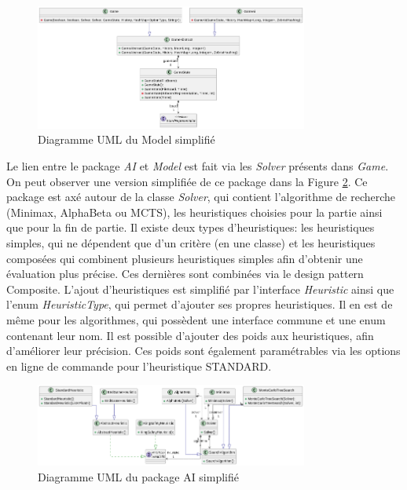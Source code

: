 \documentclass{article}
\begin{document}
\begin{figure}[h]
    \centering
    \includegraphics[width=0.8\textwidth]{uml_model}
    \caption{Diagramme UML du Model simplifié}
    \label{umlModel}
\end{figure}
\FloatBarrier

Le lien entre le package \textit{AI} et \textit{Model} est fait via les \textit{Solver} présents dans \textit{Game}.
On peut observer une version simplifiée de ce package dans la Figure \ref{umlAi}. Ce package est axé autour de la classe
\textit{Solver}, qui contient l'algorithme de recherche (Minimax, AlphaBeta ou MCTS), les heuristiques choisies pour la partie ainsi que pour la fin de partie.
Il existe deux types d'heuristiques: les heuristiques simples, qui ne dépendent que d'un critère (en une classe) et les heuristiques composées qui combinent 
plusieurs heuristiques simples afin d'obtenir une évaluation plus précise. Ces dernières sont combinées via le design pattern Composite.
L'ajout d'heuristiques est simplifié par l'interface \textit{Heuristic} ainsi que l'enum \textit{HeuristicType}, qui permet d'ajouter ses propres heuristiques.
Il en est de même pour les algorithmes, qui possèdent une interface commune et une enum contenant leur nom.
Il est possible d'ajouter des poids aux heuristiques, afin d'améliorer leur précision. Ces poids sont également paramétrables via les
options en ligne de commande pour l'heuristique STANDARD.
\begin{figure}[h]
    \centering
    \includegraphics[width=0.8\textwidth]{uml_ai}
    \caption{Diagramme UML du package AI simplifié}
    \label{umlAi}
\end{figure}
\FloatBarrier
\end{document}
